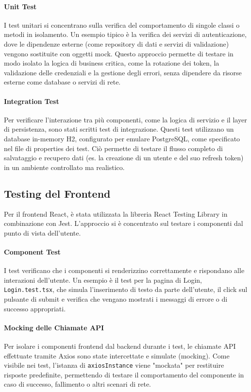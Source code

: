 \documentclass[12pt,a4paper,openright,twoside]{book}
\begin{document}
\paragraph{Unit Test} I test unitari si concentrano sulla verifica del comportamento di singole classi o metodi in isolamento. Un esempio tipico è la verifica dei servizi di autenticazione, dove le dipendenze esterne (come repository di dati e servizi di validazione) vengono sostituite con oggetti mock. Questo approccio permette di testare in modo isolato la logica di business critica, come la rotazione dei token, la validazione delle credenziali e la gestione degli errori, senza dipendere da risorse esterne come database o servizi di rete.

\paragraph{Integration Test} Per verificare l'interazione tra più componenti, come la logica di servizio e il layer di persistenza, sono stati scritti test di integrazione. Questi test utilizzano un database in-memory H2, configurato per emulare PostgreSQL, come specificato nel file di properties dei test. Ciò permette di testare il flusso completo di salvataggio e recupero dati (es. la creazione di un utente e del suo refresh token) in un ambiente controllato ma realistico.

\subsection{Testing del Frontend}
Per il frontend React, è stata utilizzata la libreria React Testing Library in combinazione con Jest. L'approccio si è concentrato sul testare i componenti dal punto di vista dell'utente.

\paragraph{Component Test} I test verificano che i componenti si renderizzino correttamente e rispondano alle interazioni dell'utente. Un esempio è il test per la pagina di Login, \texttt{Login.test.tsx}, che simula l'inserimento di testo da parte dell'utente, il click sul pulsante di submit e verifica che vengano mostrati i messaggi di errore o di successo appropriati.

\paragraph{Mocking delle Chiamate API} Per isolare i componenti frontend dal backend durante i test, le chiamate API effettuate tramite Axios sono state intercettate e simulate (mocking). Come visibile nei test, l'istanza di \texttt{axiosInstance} viene "mockata" per restituire risposte predefinite, permettendo di testare il comportamento del componente in caso di successo, fallimento o altri scenari di rete.
\end{document}
